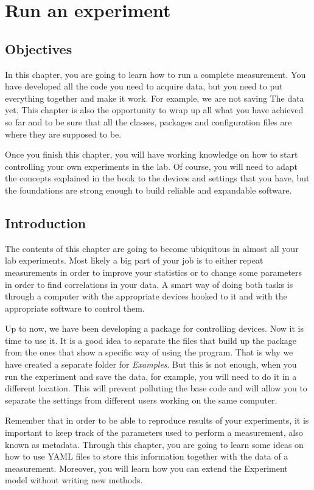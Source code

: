 \chapter{Run an experiment}\label{run-anexperiment}

\section{Objectives}
In this chapter, you are going to learn how to run a complete measurement. You have developed all the code you need to acquire data, but you need
to put everything together and make it work. For example, we are not saving The data yet. This chapter is also the opportunity to wrap up all what you have achieved so far and to be sure that all the classes, packages and configuration files are where
they are supposed to be.

Once you finish this chapter, you will have working knowledge on how to start controlling your own experiments in the lab. Of course, you will
need to adapt the concepts explained in the book to the devices and settings that you have, but the foundations are strong enough to build
reliable and expandable software.

\section{Introduction}
The contents of this chapter are going to become ubiquitous in almost all your lab experiments. Most likely a big part of your job is to either repeat measurements in order to improve your statistics or to change some parameters in order to find correlations in your data. A smart way of doing both tasks is through a computer with the appropriate devices hooked to it and with the appropriate software to control them.

Up to now, we have been developing a package for controlling devices. Now it is time to use it. It is a good idea to separate the files that build up the package from the ones that show a specific way of using the program. That is why we have created a separate folder for \emph{Examples}. But this is not enough, when you run the experiment and save the data, for example, you will need to do it in a different location. This will prevent polluting the base code and will allow you to separate the settings from different users working on the same computer.

Remember that in order to be able to reproduce results of your experiments, it is important to keep track of the parameters used to
perform a measurement, also known as metadata. Through this chapter, you are going to learn some ideas on how to use {YAML} files to store this information together with the data of a measurement. Moreover, you will learn how you can extend the Experiment model without writing new methods.

